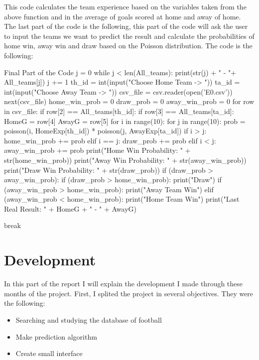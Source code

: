 \documentclass[12pt]{article}
\begin{document}
This code calculates the team experience based on the variables taken from the above function and in the average of goals scored at home and away of home. The last part of the code is the following, this part of the code will ask the user to input the teams we want to predict the result and calculate the probabilities of home win, away win and draw based on the Poisson distribution. The code is the following:

\begin{codelisting}{Final Part of the Code}
j = 0
while j < len(All_teams):
	print(str(j) + " - "+ All_teams[j])
	j += 1
th_id = int(input("Choose Home Team -> "))
ta_id = int(input("Choose Away Team -> "))
csv_file = csv.reader(open('E0.csv'))
next(csv_file)
home_win_prob = 0
draw_prob = 0
away_win_prob = 0
for row in csv_file:
     if row[2] == All_teams[th_id]:
          if row[3] == All_teams[ta_id]:
               HomeG = row[4]
               AwayG = row[5]
               for i in range(10):
                    for j in range(10):
                         prob = poisson(i, HomeExp[th_id]) 
* poisson(j, AwayExp[ta_id])
                         if i > j:
                              home_win_prob += prob
                         elif i == j:
                              draw_prob += prob
                         elif i < j:
                              away_win_prob += prob					
               print("Home Win Probability: " 
+ str(home_win_prob))
               print("Away Win Probability: " 
+ str(away_win_prob))
               print("Draw Win Probability: " 
+ str(draw_prob))
               if (draw_prob > away_win_prob):
                    if (draw_prob > home_win_prob):
                         print("Draw")
               if (away_win_prob > home_win_prob):
                    print("Away Team Win")
               elif (away_win_prob < home_win_prob):
                    print("Home Team Win")
               print("Last Real Result: " + HomeG + " - " 
+ AwayG)

               break
\end{codelisting}

\section{Development}
In this part of the report I will explain the development I made through these months of the project. First, I splited the project in several objectives. They were the following:
\begin{itemize}
	\item Searching and studying the database of football
	\item Make prediction algorithm
	\item Create small interface
\end{itemize}
\end{document}
